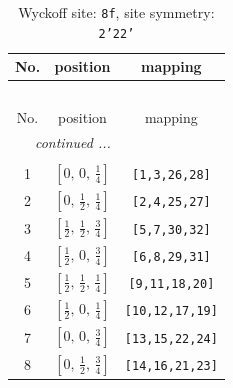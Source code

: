 \documentclass[fleqn,8pt]{jsarticle}
\begin{document}
\begin{longtable}{ccc}
\caption{Wyckoff site: {\tt 8f}, site symmetry: {\tt 2'22'}}
 \\
 \hline \hline
No. & position & mapping \\ \hline \endfirsthead

\multicolumn{2}{l}{\tablename\ \thetable{}} \\
 \hline \hline
No. & position & mapping \\ \hline \endhead

 \hline \hline
\multicolumn{2}{r}{\footnotesize\it continued ...} \\ \endfoot

 \hline \hline
\multicolumn{2}{r}{} \\ \endlastfoot

1 & $\left[ 0,\, 0,\, \frac{1}{4} \right]$ & {\tt [1,3,26,28]} \\ \hline
2 & $\left[ 0,\, \frac{1}{2},\, \frac{1}{4} \right]$ & {\tt [2,4,25,27]} \\ \hline
3 & $\left[ \frac{1}{2},\, \frac{1}{2},\, \frac{3}{4} \right]$ & {\tt [5,7,30,32]} \\ \hline
4 & $\left[ \frac{1}{2},\, 0,\, \frac{3}{4} \right]$ & {\tt [6,8,29,31]} \\ \hline
5 & $\left[ \frac{1}{2},\, \frac{1}{2},\, \frac{1}{4} \right]$ & {\tt [9,11,18,20]} \\ \hline
6 & $\left[ \frac{1}{2},\, 0,\, \frac{1}{4} \right]$ & {\tt [10,12,17,19]} \\ \hline
7 & $\left[ 0,\, 0,\, \frac{3}{4} \right]$ & {\tt [13,15,22,24]} \\ \hline
8 & $\left[ 0,\, \frac{1}{2},\, \frac{3}{4} \right]$ & {\tt [14,16,21,23]} \\
\end{longtable}
\renewcommand{\arraystretch}{1.2}
\end{document}
